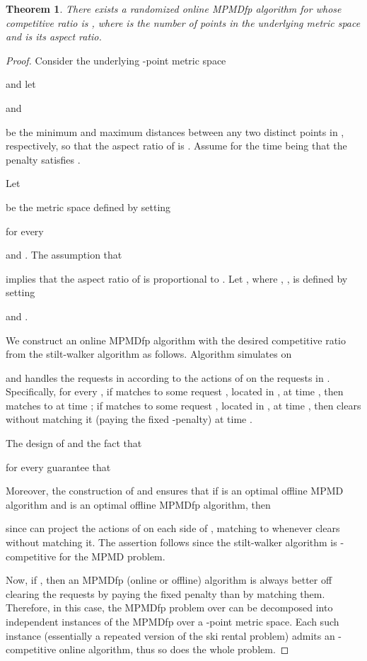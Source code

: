 \documentclass[11pt]{article}
\newtheorem{theorem}{Theorem}[section]
\theoremstyle{definition}
\theoremstyle{plain}
\newtheorem{theorem}{Theorem}
\theoremstyle{definition}
\theoremstyle{plain}
\newtheorem{theorem}{Theorem}[section]
\theoremstyle{definition}
\theoremstyle{plain}
\begin{document}
\begin{theorem}
There exists a randomized online MPMDfp algorithm for  whose
competitive ratio is
,
where  is the number of points in the underlying metric space and 
is its aspect ratio.
\end{theorem}
\begin{proof}
Consider the underlying -point metric space

and let

and

be the minimum and maximum distances between any two distinct points in
, respectively, so that the aspect ratio of  is
.
Assume for the time being that the penalty  satisfies
.

Let

be the metric space defined by setting

for every

and
.
The assumption that

implies that the aspect ratio of  is proportional to
.
Let
,
where , , is defined by setting

and
.

We construct an online MPMDfp algorithm  with the desired
competitive ratio from the stilt-walker algorithm  as follows.
Algorithm  simulates  on

and handles the requests in  according to the actions of  on the
requests in .
Specifically, for every
,
if  matches  to some request , located in
,
at time , then  matches  to  at time ;
if  matches  to some request , located in
, at time , then  clears  without
matching it (paying the fixed -penalty) at time .

The design of  and the fact that

for every 
guarantee that

Moreover, the construction of  and 
ensures that if  is an optimal offline MPMD algorithm and
 is an optimal offline MPMDfp algorithm, then

since  can project the actions of  on each
side of , matching  to  whenever
 clears  without matching it.
The assertion follows since the stilt-walker algorithm  is -competitive for the MPMD problem.

Now, if
,
then an MPMDfp (online or offline) algorithm is always better off clearing the
requests by paying the fixed penalty than by matching them.
Therefore, in this case, the MPMDfp problem over  can be
decomposed into  independent instances of the MPMDfp over a -point
metric space.
Each such instance (essentially a repeated version of the ski rental problem)
admits an -competitive online algorithm, thus so does the whole
problem.


\end{proof}
\end{document}
